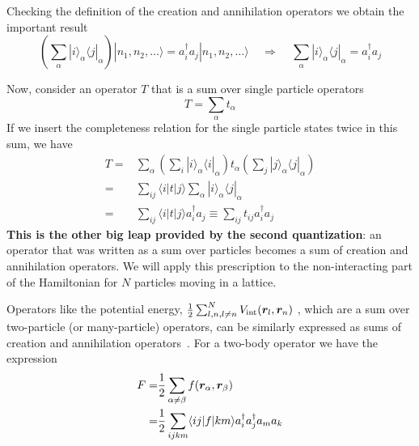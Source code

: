 Checking the definition of the creation and annihilation operators we obtain
the important result 
\begin{equation}
  \left(
   \sum_{\alpha} |i\rangle_{\alpha} \langle j | _{\alpha}  \right)
  | n_{1},  n_{2}, \ldots \rangle 
   =   a_{i}^{\dagger} a_{j} 
  | n_{1},  n_{2}, \ldots \rangle 
  ~~~~~ \Rightarrow ~~~~~ 
   \sum_{\alpha} |i\rangle_{\alpha} \langle j | _{\alpha} = 
     a_{i}^{\dagger} a_{j} 
\end{equation}

Now, consider an operator $T$ that is a sum over single particle operators
\begin{equation}
  T = \sum_{\alpha} t_{\alpha}
 \label{eq:defsingleparticleop}
\end{equation}  
If we insert the completeness relation for the single particle states twice in
this sum, we have \begin{equation}
\begin{split}
  T = & \sum_{\alpha} 
        \left( \sum_{i} |i\rangle_{\alpha}\langle i |_{\alpha} \right)
        t_{\alpha} 
        \left( \sum_{j} |j\rangle_{\alpha}\langle j |_{\alpha} \right) \\
    = & \sum_{ij}   \langle i | t | j \rangle  
          \sum_{\alpha} |i\rangle_{\alpha} \langle j |_{\alpha} \\ 
    = & \sum_{ij}   \langle i | t | j \rangle a_{i}^{\dagger} a_{j} 
          \equiv \sum_{ij} t_{ij}   a_{i}^{\dagger} a_{j} 
\end{split}  
\end{equation}
\textbf{This is the other big leap provided by the second quantization}:  an
operator that was written as a sum over particles becomes a sum of creation and
annihilation operators.   We will apply this prescription to the
non-interacting part of the Hamiltonian for $N$ particles moving in a lattice.  

Operators like the potential energy, $ \frac{1}{2}\sum_{l,n,l\neq n}^{N}
V_{\mathrm{int}}(\bm{r}_{l}, \bm{r}_{n} )$ , which are a sum over two-particle
(or many-particle) operators,  can be similarly expressed as sums of creation
and annihilation operators~\cite{schwabl2005advanced}.  For a two-body operator
we have the expression
\begin{equation}
\begin{split}
F = & \frac{1}{2} \sum_{\alpha\neq\beta} f(\bm{r}_{\alpha}, \bm{r}_{\beta} )  \\
  = & \frac{1}{2} \sum_{ijkm} \langle ij | f | km \rangle 
        a_{i}^{\dagger} a_{j}^{\dagger} a_{m} a_{k} 
\end{split}
\end{equation}

